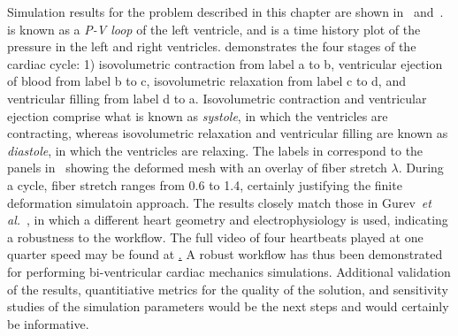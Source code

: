 Simulation results for the problem described in this chapter are shown in~ and~.  is known as a \textit{P-V loop} of the left ventricle, and  is a time history plot of the pressure in the left and right ventricles.  demonstrates the four stages of the cardiac cycle: 1) isovolumetric contraction from label a to b, ventricular ejection of blood from label b to c, isovolumetric relaxation from label c to d, and ventricular filling from label d to a. Isovolumetric contraction and ventricular ejection comprise what is known as \textit{systole}, in which the ventricles are contracting, whereas isovolumetric relaxation and ventricular filling are known as \textit{diastole}, in which the ventricles are relaxing. The labels in  correspond to the panels in~ showing the deformed mesh with an overlay of fiber stretch $\lambda$. During a cycle, fiber stretch ranges from 0.6 to 1.4, certainly justifying the finite deformation simulatoin approach. The results closely match those in Gurev~\textit{et al.}~\cite{gurev_2015}, in which a different heart geometry and electrophysiology is used, indicating a robustness to the workflow. The full video of four heartbeats played at one quarter speed may be found at \href{youtu.be/RtQKEjdR4MU}. A robust workflow has thus been demonstrated for performing bi-ventricular cardiac mechanics simulations. Additional validation of the results, quantitiative metrics for the quality of the solution, and sensitivity studies of the simulation parameters would be the next steps and would certainly be informative.

